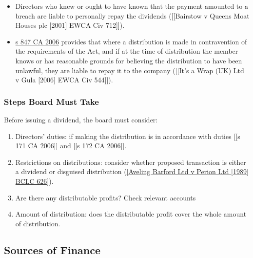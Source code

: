 \documentclass[
]{article}
\providecommand{\tightlist}{%
  \setlength{\itemsep}{0pt}\setlength{\parskip}{0pt}}
\begin{document}
\begin{itemize}
\tightlist
\item
  Directors who knew or ought to have known that the payment amounted to
  a breach are liable to personally repay the dividends ({[}{[}Bairstow
  v Queens Moat Houses plc {[}2001{]} EWCA Civ 712{]}{]}).
\item
  \href{https://www.legislation.gov.uk/ukpga/2006/46/section/847}{s 847
  CA 2006} provides that where a distribution is made in contravention
  of the requirements of the Act, and if at the time of distribution the
  member knows or has reasonable grounds for believing the distribution
  to have been unlawful, they are liable to repay it to the company
  ({[}{[}It's a Wrap (UK) Ltd v Gula {[}2006{]} EWCA Civ 544{]}{]}).
\end{itemize}

\hypertarget{steps-board-must-take}{%
\subsubsection{Steps Board Must Take}\label{steps-board-must-take}}

Before issuing a dividend, the board must consider:

\begin{enumerate}
\def\labelenumi{\arabic{enumi}.}
\tightlist
\item
  Directors' duties: if making the distribution is in accordance with
  duties {[}{[}s 171 CA 2006{]}{]} and {[}{[}s 172 CA 2006{]}{]}.
\item
  Restrictions on distributions: consider whether proposed transaction
  is either a dividend or disguised distribution
  (\href{intra-group\%20transfers}{{[}Aveling Barford Ltd v Perion Ltd
  {[}1989{]} BCLC 626{]}}).
\item
  Are there any distributable profits? Check relevant accounts
\item
  Amount of distribution: does the distributable profit cover the whole
  amount of distribution.
\end{enumerate}

\hypertarget{sources-of-finance}{%
\subsection{Sources of Finance}\label{sources-of-finance}}
\end{document}
